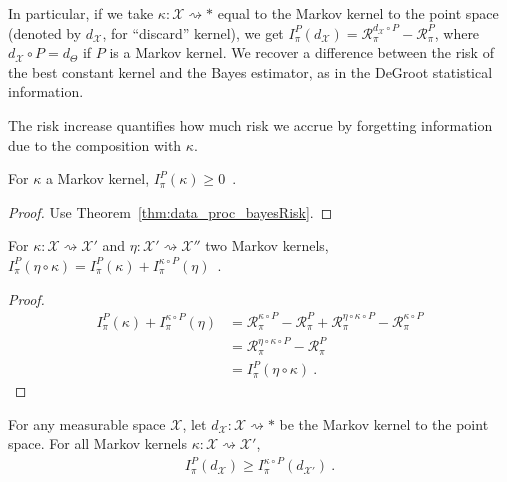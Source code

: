In particular, if we take $\kappa : \mathcal X \rightsquigarrow *$ equal to the Markov kernel to the point space (denoted by $d_{\mathcal X}$, for ``discard'' kernel), we get $I^P_{\pi}(d_{\mathcal X}) = \mathcal R^{d_{\mathcal X} \circ P}_\pi - \mathcal R^P_\pi$, where $d_{\mathcal X} \circ P = d_\Theta$ if $P$ is a Markov kernel. We recover a difference between the risk of the best constant kernel and the Bayes estimator, as in the DeGroot statistical information.

The risk increase quantifies how much risk we accrue by forgetting information due to the composition with $\kappa$.

\begin{lemma}
  \label{lem:riskIncrease_nonneg}
  For $\kappa$ a Markov kernel, $I^P_\pi(\kappa) \ge 0$~.
\end{lemma}

\begin{proof}%
{}
Use Theorem~\ref{thm:data_proc_bayesRisk}.
\end{proof}

\begin{lemma}
  \label{lem:riskIncrease_comp}
  \leanok
  For $\kappa : \mathcal X \rightsquigarrow \mathcal X'$ and $\eta : \mathcal X' \rightsquigarrow \mathcal X''$ two Markov kernels,
  $I^P_\pi(\eta \circ \kappa) = I^P_\pi(\kappa) + I^{\kappa \circ P}_\pi(\eta)$~.
\end{lemma}

\begin{proof}\leanok
\uses{}
\begin{align*}
I^P_\pi(\kappa) + I^{\kappa \circ P}_\pi(\eta)
&= \mathcal R^{\kappa \circ P}_\pi - \mathcal R^{P}_\pi + \mathcal R^{\eta \circ \kappa \circ P}_\pi - \mathcal R^{\kappa \circ P}_\pi
\\
&= \mathcal R^{\eta \circ \kappa \circ P}_\pi - \mathcal R^{P}_\pi
\\
&= I^P_\pi(\eta \circ \kappa)
\: .
\end{align*}
\end{proof}

\begin{lemma}
  \label{lem:riskIncrease_comp_del}
  \leanok
  For any measurable space $\mathcal X$, let $d_{\mathcal X} : \mathcal X \rightsquigarrow *$ be the Markov kernel to the point space.
  For all Markov kernels $\kappa : \mathcal X \rightsquigarrow \mathcal X'$,
  \begin{align*}
  I_\pi^P(d_{\mathcal X}) \ge I_\pi^{\kappa \circ P}(d_{\mathcal X'}) \: .
  \end{align*}
\end{lemma}

